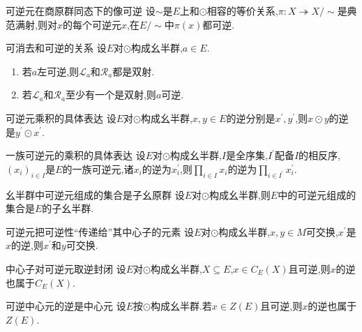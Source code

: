 \begin{corollary}{可逆元在商原群同态下的像可逆}{}
	设$\sim$是$E$上和$\odot$相容的等价关系,$\pi:X\twoheadrightarrow X/\sim$是典范满射,则对$x$的每个可逆元$x$,在$E/\sim$中$\pi\left(x\right)$都可逆.
\end{corollary}

\begin{proposition}{可消去和可逆的关系}{}
	设$E$对$\odot$构成幺半群,$a\in E$.
	\begin{enumerate}
		\item 若$a$左可逆,则$\mathcal{L}_{a}$和$\mathcal{R}_{a}$都是双射.
		\item 若$\mathcal{L}_{a}$和$\mathcal{R}_{a}$至少有一个是双射,则$a$可逆.
	\end{enumerate}
\end{proposition}

\begin{proposition}{可逆元乘积的具体表达}{}
	设$E$对$\odot$构成幺半群,$x,y\in E$的逆分别是$x^{\prime},y^{\prime}$,则$x\odot y$的逆是$y^{\prime}\odot x^{\prime}$.
\end{proposition}

\begin{corollary}{一族可逆元的乘积的具体表达}{}
	设$E$对$\odot$构成幺半群,$I$是全序集,$I^{\prime}$配备$I$的相反序,$\left(x_{i}\right)_{i\in I}$是$E$的一族可逆元,诸$x_{i}$的逆为$x_{i}^{\prime}$,则$\prod\limits_{i\in I}x_{i}$的逆为$\prod\limits_{i\in I^{\prime}}x_{i}^{\prime}$.
\end{corollary}

\begin{corollary}{幺半群中可逆元组成的集合是子幺原群}{}
	设$E$对$\odot$构成幺半群,则$E$中的可逆元组成的集合是$E$的子幺半群.
\end{corollary}

\begin{proposition}{可逆元把可逆性``传递给''其中心子的元素}{}
	设$E$对$\odot$构成幺半群,$x,y\in M$可交换,$x^{\prime}$是$x$的逆,则$x^{\prime}$和$y$可交换.
\end{proposition}

\begin{corollary}{中心子对可逆元取逆封闭}{}
	设$E$对$\odot$构成幺半群,$X\subseteq E$,$x\in C_{E}\left(X\right)$且可逆,则$x$的逆也属于$C_{E}\left(X\right)$.
\end{corollary}

\begin{corollary}{可逆中心元的逆是中心元}{}
	设$E$按$\odot$构成幺半群.若$x\in Z\left(E\right)$且可逆,则$x$的逆也属于$Z\left(E\right)$.
\end{corollary}




















